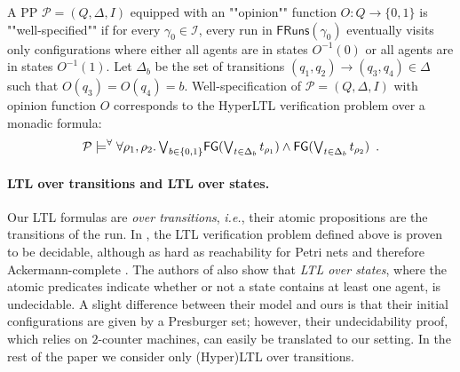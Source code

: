 \documentclass[10pt,a4paper]{article}
\newcommand{\set}[1]{\{#1\}}
\newcommand{\fairrunsfrom}[1]{\mathsf{FRuns}(#1)}
\newcommand{\config}{\gamma}
\newcommand{\run}{\rho}
\newcommand{\transitions}{\Delta}
\newcommand{\PP}{\mathcal{P}}                  %
\newcommand{\trans}[1]{\xrightarrow{#1}}       %
\newcommand{\initial}{\mathcal{I}}   %
\newcommand{\ltlglobally}{\mathsf{G}}
\newcommand{\ltlfinally}{\mathsf{F}}
\newcommand{\modelsforall}{\models^{\forall}}
\begin{document}
\begin{example}
	A PP \(\PP=(Q,\transitions,I)\) equipped with an ""opinion"" function \(O\colon Q \rightarrow \set{0,1}\) is ""well-specified"" if for every \(\config_0 \in\initial\), every run in \(\fairrunsfrom{\config_0}\) eventually visits only configurations where either all agents are in states \(O^{-1}(0)\) or all agents are in states \(O^{-1}(1)\).
	Let \(\transitions_b\) be the set of transitions \((q_1, q_2)\trans{} (q_3, q_4)\in\transitions\) such that \(O(q_3)=O(q_4)=b\).
	Well-specification of \(\PP=(Q,\transitions,I)\) with opinion function \(O\) corresponds to the HyperLTL verification problem over a monadic formula: \[ \PP \modelsforall \forall \run_1, \run_2 \ldotp \textstyle{\bigvee_{b \in \set{0,1}}} \ltlfinally \ltlglobally (\bigvee_{t\in\transitions_b} t_{\run_1}) \land \ltlfinally \ltlglobally(\bigvee_{t\in\transitions_b} t_{\run_2})\enspace .
	\]
\end{example}

\paragraph*{LTL over transitions and LTL over states.}
Our LTL formulas are \emph{over transitions}, \emph{i.e.}, their atomic propositions are the transitions of the run.
%
In \cite[Theorems 9 and 10]{EGLM16}, the LTL verification problem defined above is proven to be decidable, although as hard as reachability for Petri nets and therefore Ackermann-complete \cite{Leroux2022,Czerwinski2022}.
The authors of \cite{EGLM16} also show that \emph{LTL over states}, where the atomic predicates indicate whether or not a state contains at least one agent, is undecidable.
A slight difference between their model and ours is that their initial configurations are given by a Presburger set; however, their undecidability proof, which relies on \(2\)-counter machines, can easily be translated to our setting.
In the rest of the paper we consider only (Hyper)LTL over transitions.

%
%
%
%
%
%
%
%

%
%
%
%
%
%
%
%
%
%
%
%
%
%
%
\end{document}
